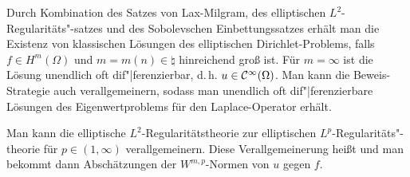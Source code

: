 \linie

\begin{Bem}
    Durch Kombination des Satzes von Lax-Milgram,
    des elliptischen $L^2$-Regularitäts"-satzes und
    des Sobolevschen Einbettungssatzes erhält man die Existenz von klassischen Lösungen
    des elliptischen Dirichlet-Problems, falls $f \in H^m(\Omega)$ und $m = m(n) \in \natural$
    hinreichend groß ist.
    Für $m = \infty$ ist die Lösung unendlich oft dif"|ferenzierbar,
    d.\,h. $u \in \mathcal{C}^\infty(\Omega)$.
    Man kann die Beweis-Strategie auch verallgemeinern, sodass man unendlich oft dif"|ferenzierbare
    Lösungen des Eigenwertproblems für den Laplace-Operator erhält.
\end{Bem}

\begin{Bem}
    Man kann die elliptische $L^2$-Regularitätstheorie zur
    elliptischen $L^p$-Regularitäts"-theorie für $p \in (1, \infty)$ verallgemeinern.
    Diese Verallgemeinerung heißt  und
    man bekommt dann Abschätzungen der $W^{m,p}$-Normen von $u$ gegen $f$.
\end{Bem}

\pagebreak
